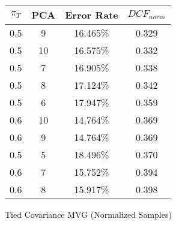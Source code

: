 \begin{tabular}{|c|c|c|c|}
\hline
$\pi_T$ & PCA & Error Rate & $DCF_{norm}$\\
\hline
0.5 & 9 & 16.465\% & 0.329\\
\hline
0.5 & 10 & 16.575\% & 0.332\\
\hline
0.5 & 7 & 16.905\% & 0.338\\
\hline
0.5 & 8 & 17.124\% & 0.342\\
\hline
0.5 & 6 & 17.947\% & 0.359\\
\hline
0.6 & 10 & 14.764\% & 0.369\\
\hline
0.6 & 9 & 14.764\% & 0.369\\
\hline
0.5 & 5 & 18.496\% & 0.370\\
\hline
0.6 & 7 & 15.752\% & 0.394\\
\hline
0.6 & 8 & 15.917\% & 0.398\\
\hline
\end{tabular}
\caption{Tied Covariance MVG (Normalized Samples)}\label{tab:mvgn_tiedcov}
